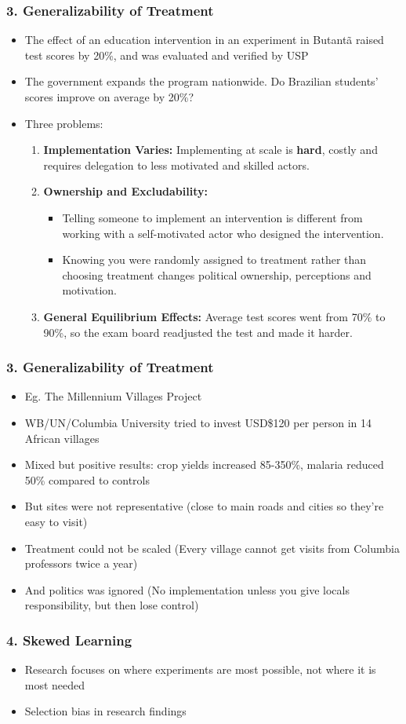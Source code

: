 \documentclass[xcolor=x11names,compress]{beamer}\usepackage[]{graphicx}\usepackage[]{color}
\renewcommand{\(}{\begin{columns}}
\renewcommand{\)}{\end{columns}}
\newcommand{\<}[1]{\begin{column}{#1}}
\renewcommand{\>}{\end{column}}
\begin{document}
\begin{frame}
\frametitle{3. Generalizability of Treatment}
\begin{itemize}
\item The effect of an education intervention in an experiment in Butant\~{a} raised test scores by 20\%, and was evaluated and verified by USP
\pause
\item The government expands the program nationwide. Do Brazilian students' scores improve on average by 20\%?
\pause
\item Three problems:
\begin{enumerate}
\item \textbf{Implementation Varies:} Implementing at scale is \textbf{hard}, costly and requires delegation to less motivated and skilled actors.
\pause
\item \textbf{Ownership and Excludability:} 
\begin{itemize}
\item Telling someone to implement an intervention is different from working with a self-motivated actor who designed the intervention. 
\pause
\item Knowing you were randomly assigned to treatment rather than choosing treatment changes political ownership, perceptions and motivation.
\end{itemize}
\pause
\item \textbf{General Equilibrium Effects:} Average test scores went from 70\% to 90\%, so the exam board readjusted the test and made it harder.
\end{enumerate}
\end{itemize}
\end{frame}

\begin{frame}
\frametitle{3. Generalizability of Treatment}
\begin{itemize}
\item Eg. The Millennium Villages Project
\pause
\item WB/UN/Columbia University tried to invest USD\$120 per person in 14 African villages
\pause
\item Mixed but positive results: crop yields increased 85-350\%, malaria reduced 50\% compared to controls
\pause
\item But sites were not representative (close to main roads and cities so they're easy to visit)
\pause
\item Treatment could not be scaled (Every village cannot get visits from Columbia professors twice a year)
\pause
\item And politics was ignored (No implementation unless you give locals responsibility, but then lose control)
\end{itemize}
\end{frame}

\begin{frame}
\frametitle{4. Skewed Learning}
\begin{itemize}
\item Research focuses on where experiments are most possible, not where it is most needed
\pause
\item Selection bias in research findings
\end{itemize}
\end{frame}
\end{document}

